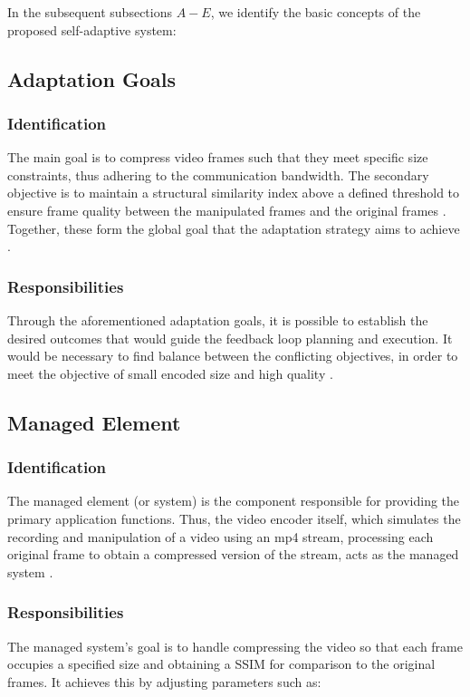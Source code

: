 \documentclass[conference]{IEEEtran}
\begin{document}
In the subsequent subsections $A-E$, we identify the basic concepts of the proposed self-adaptive system:

\subsection{\textbf{Adaptation Goals}}
\subsubsection{\textbf{Identification}}
The main goal is to compress video frames such that they meet specific size constraints, thus adhering to the communication bandwidth. The secondary objective is to maintain a structural similarity index above a defined threshold to ensure frame quality between the manipulated frames and the original frames \cite{DARTS_pdf}. Together, these form the global goal that the adaptation strategy aims to achieve \cite{SAVE_pdf}.\\

\subsubsection{\textbf{Responsibilities}}
Through the aforementioned adaptation goals, it is possible to establish the desired outcomes that would guide the feedback loop planning and execution. It would be necessary to find balance between the conflicting objectives, in order to meet the objective of small encoded size and high quality \cite{DARTS_pdf}.

\subsection{\textbf{Managed Element}}
\subsubsection{\textbf{Identification}}
The managed element (or system) is the component responsible for providing the primary application functions. Thus, the video encoder itself, which simulates the recording and manipulation of a video using an mp4 stream, processing each original frame to obtain a compressed version of the stream, acts as the managed system \cite{DARTS_pdf}.\\

\subsubsection{\textbf{Responsibilities}}
The managed system's goal is to handle compressing the video so that each frame occupies a specified size and obtaining a SSIM for comparison to the original frames. It achieves this by adjusting parameters such as:\\
\end{document}
